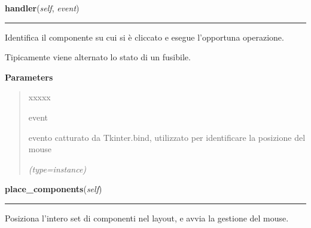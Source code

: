    \vspace{0.5ex}

\hspace{.8\funcindent}\begin{boxedminipage}{\funcwidth}

    \raggedright \textbf{handler}(\textit{self}, \textit{event})

    \vspace{-1.5ex}

    \rule{\textwidth}{0.5\fboxrule}
\setlength{\parskip}{2ex}
    Identifica il componente su cui si è cliccato e esegue l'opportuna 
    operazione.

    Tipicamente viene alternato lo stato di un fusibile.

\setlength{\parskip}{1ex}
      \textbf{Parameters}
      \vspace{-1ex}

      \begin{quote}
        \begin{Ventry}{xxxxx}

          \item[event]

          evento catturato da Tkinter.bind, utilizzato per identificare la 
          posizione del mouse

            {\it (type=instance)}

        \end{Ventry}

      \end{quote}

    \end{boxedminipage}

    \label{pla:Pla:place_components}

    \vspace{0.5ex}

\hspace{.8\funcindent}\begin{boxedminipage}{\funcwidth}

    \raggedright \textbf{place\_components}(\textit{self})

    \vspace{-1.5ex}

    \rule{\textwidth}{0.5\fboxrule}
\setlength{\parskip}{2ex}
    Posiziona l'intero set di componenti nel layout, e avvia la gestione 
    del mouse.

\setlength{\parskip}{1ex}
    \end{boxedminipage}

